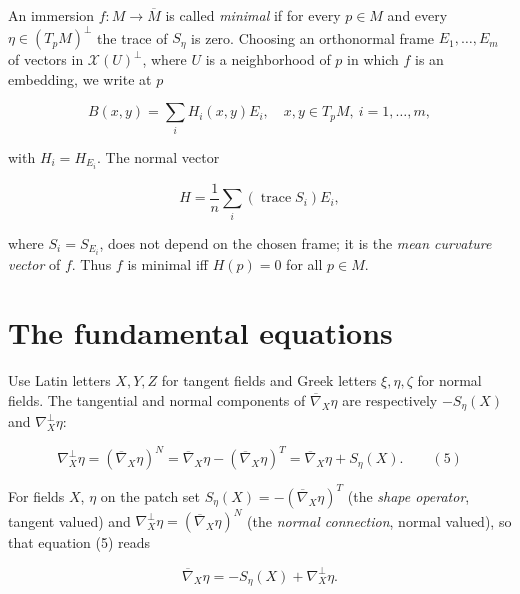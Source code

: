 \begin{definition}
  \label{def:dc-ch6-2-10}
  \leanok
  An immersion $f:M\to\overline{M}$ is called \emph{minimal} if for every $p\in M$ and
  every $\eta\in(T_pM)^\perp$ the trace of $S_\eta$ is zero. Choosing an orthonormal frame
  $E_1,\dots,E_m$ of vectors in $\mathcal{X}(U)^\perp$, where $U$ is a neighborhood
  of $p$ in which $f$ is an embedding, we write at $p$
  
  $$
  B(x,y)=\sum_i H_i(x,y)E_i,\quad x,y\in T_pM,\ i=1,\dots,m,
  $$
  
  with $H_i=H_{E_i}$. The normal vector
  
  $$
  H=\frac{1}{n}\sum_i(\operatorname{trace}S_i)E_i,
  $$
  
  where $S_i=S_{E_i}$, does not depend on the chosen frame; it is the \emph{mean
  curvature vector} of $f$. Thus $f$ is minimal iff $H(p)=0$ for all $p\in M$.
\end{definition}

\section{The fundamental equations}

Use Latin letters $X,Y,Z$ for tangent fields and Greek letters $\xi,\eta,\zeta$
for normal fields. The tangential and normal components of
$\overline{\nabla}_X\eta$ are respectively $-S_\eta(X)$ and $\nabla_X^\perp\eta$:

$$
\nabla_X^\perp\eta=(\overline{\nabla}_X\eta)^N=\overline{\nabla}_X\eta-(\overline{\nabla}_X\eta)^T=\overline{\nabla}_X\eta+S_\eta(X).\qquad(5)
$$

\begin{definition}
  \label{def:dc-ch6-3-normal-connection}
  \leanok
  For fields $X$, $\eta$ on the patch set
  $S_\eta(X)=-(\overline{\nabla}_X\eta)^T$ (the \emph{shape operator}, tangent
  valued) and $\nabla^\perp_X\eta=(\overline{\nabla}_X\eta)^N$ (the \emph{normal
  connection}, normal valued), so that equation (5) reads

  $$
  \overline{\nabla}_X\eta=-S_\eta(X)+\nabla^\perp_X\eta.
  $$
\end{definition}

